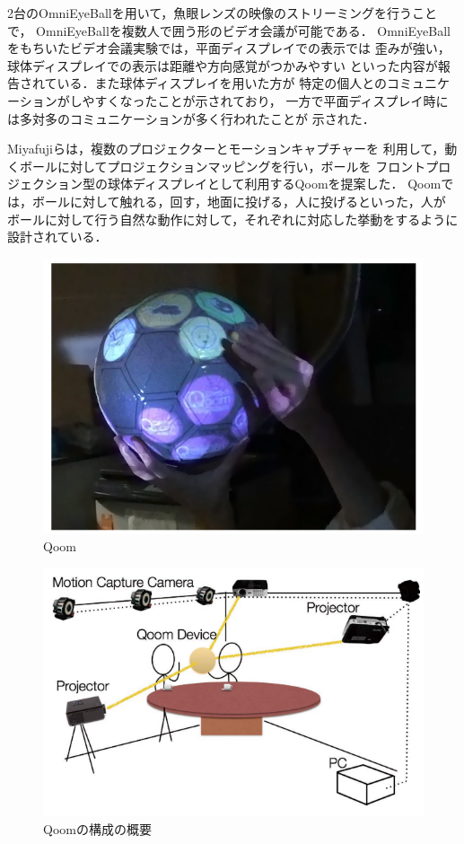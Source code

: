 2台のOmniEyeBallを用いて，魚眼レンズの映像のストリーミングを行うことで，
OmniEyeBallを複数人で囲う形のビデオ会議が可能である．
OmniEyeBallをもちいたビデオ会議実験では，平面ディスプレイでの表示では
歪みが強い，球体ディスプレイでの表示は距離や方向感覚がつかみやすい
といった内容が報告されている．また球体ディスプレイを用いた方が
特定の個人とのコミュニケーションがしやすくなったことが示されており，
一方で平面ディスプレイ時には多対多のコミュニケーションが多く行われたことが
示された．

Miyafujiら\cite{25}は，複数のプロジェクターとモーションキャプチャーを
利用して，動くボールに対してプロジェクションマッピングを行い，ボールを
フロントプロジェクション型の球体ディスプレイとして利用するQoomを提案した．
Qoomでは，ボールに対して触れる，回す，地面に投げる，人に投げるといった，人が
ボールに対して行う自然な動作に対して，それぞれに対応した挙動をするように設計されている．

\begin{figure}[tbp]
  \centering
  \includegraphics[scale=0.9]{fig/qoom.png}
  \caption{Qoom\cite{25}}
\end{figure}

\begin{figure}[tbp]
  \centering
  \includegraphics[scale=1.0]{fig/qoomsys.png}
  \caption{Qoomの構成の概要\cite{25}}
\end{figure}

